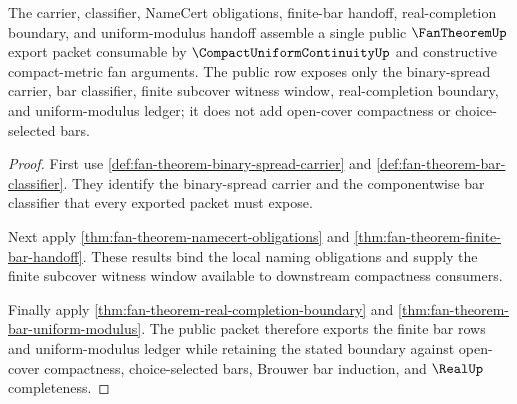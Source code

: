 \begin{theorem}
\label{thm:fantheorem-public-uniform-bar-export}
The carrier, classifier, NameCert obligations, finite-bar handoff, real-completion boundary, and uniform-modulus handoff assemble a single public $\FanTheoremUp$ export packet consumable by $\CompactUniformContinuityUp$ and constructive compact-metric fan arguments. The public row exposes only the binary-spread carrier, bar classifier, finite subcover witness window, real-completion boundary, and uniform-modulus ledger; it does not add open-cover compactness or choice-selected bars.
\end{theorem}
\begin{proof}
First use \autoref{def:fan-theorem-binary-spread-carrier} and \autoref{def:fan-theorem-bar-classifier}. They identify the binary-spread carrier and the componentwise bar classifier that every exported packet must expose.

Next apply \autoref{thm:fan-theorem-namecert-obligations} and \autoref{thm:fan-theorem-finite-bar-handoff}. These results bind the local naming obligations and supply the finite subcover witness window available to downstream compactness consumers.

Finally apply \autoref{thm:fan-theorem-real-completion-boundary} and \autoref{thm:fan-theorem-bar-uniform-modulus}. The public packet therefore exports the finite bar rows and uniform-modulus ledger while retaining the stated boundary against open-cover compactness, choice-selected bars, Brouwer bar induction, and $\RealUp$ completeness.
\end{proof}

